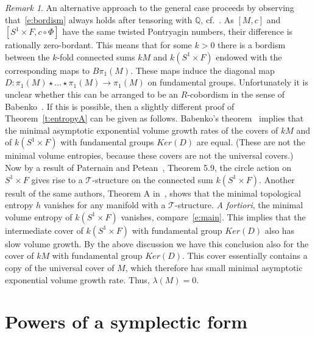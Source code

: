 \documentclass[12pt]{amsart}
\theoremstyle{definition}
\theoremstyle{remark}
\newtheorem{remark}[theorem]{Remark}
\def\bQ{{\mathbb Q}}
\def\TT{{\mathcal T}}
\begin{document}
\begin{remark}
    An alternative approach to the general case proceeds by observing that~\eqref{e:bordism}
    always holds after tensoring with $\bQ$, cf.~\cite{CF,Stong}. As $[M,c]$ and 
    $[S^{1}\times F,c\circ\Phi ]$ have the same twisted Pontryagin numbers, their difference 
    is rationally zero-bordant. This means that for some $k>0$ there is a bordism between 
    the $k$-fold connected sums $kM$ and $k(S^{1}\times F)$ endowed with the 
    corresponding maps to $B\pi_{1}(M)$. These maps induce the diagonal map
    $D\colon\pi_1(M)\star\ldots\star\pi_1(M)\longrightarrow\pi_1(M)$ on fundamental 
    groups. Unfortunately it is unclear whether this can be arranged to be an $R$-cobordism in the sense of 
    Babenko~\cite{B2}. If this is possible, then a slightly different proof of Theorem~\ref{t:entropyA} can be given 
    as follows. Babenko's theorem~\cite{B2} implies that the minimal asymptotic exponential 
    volume growth rates of the covers of $kM$ and of $k(S^{1}\times F)$ with fundamental 
    groups $Ker(D)$ are equal. (These are not the minimal volume entropies, because these 
    covers are not the universal covers.)
    Now by a result of Paternain and Petean~\cite{PP}, Theorem 5.9, the circle 
    action on $S^{1}\times F$ gives rise to a $\TT$-structure on the connected 
    sum $k(S^{1}\times F)$. Another result of the same authors, Theorem A 
    in~\cite{PP}, shows that the minimal topological entropy $h$ vanishes for 
    any manifold with a $\TT$-structure. {\it A fortiori}, the minimal volume 
    entropy of $k(S^{1}\times F)$ vanishes, compare~\eqref{e:main}. This 
    implies that the intermediate cover of $k(S^{1}\times F)$ with fundamental
    group $Ker(D)$ also has slow volume growth. By the above discussion
    we have this conclusion also for the cover of $kM$ with fundamental 
    group $Ker(D)$. This cover essentially 
    contains a copy of the universal cover of $M$, which therefore has 
    small minimal asymptotic exponential volume growth rate.
    Thus, $\lambda(M)=0$.
\end{remark}

\section{Powers of a symplectic form}\label{s:powers}
\end{document}
